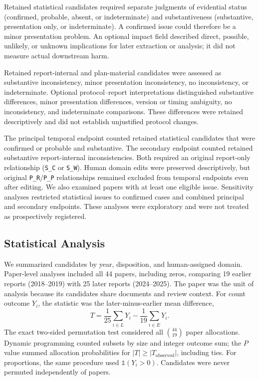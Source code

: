 \documentclass[12pt,a4paper]{article}
\begin{document}
Retained statistical candidates required separate judgments of evidential status (confirmed, probable, absent, or indeterminate) and substantiveness (substantive, presentation only, or indeterminate). A confirmed issue could therefore be a minor presentation problem. An optional impact field described direct, possible, unlikely, or unknown implications for later extraction or analysis; it did not measure actual downstream harm.

Retained report-internal and plan-material candidates were assessed as substantive inconsistency, minor presentation inconsistency, no inconsistency, or indeterminate. Optional protocol--report interpretations distinguished substantive differences, minor presentation differences, version or timing ambiguity, no inconsistency, and indeterminate comparisons. These differences were retained descriptively and did not establish unjustified protocol changes.

The principal temporal endpoint counted retained statistical candidates that were confirmed or probable and substantive. The secondary endpoint counted retained substantive report-internal inconsistencies. Both required an original report-only relationship (\texttt{S\_C} or \texttt{S\_W}). Human domain edits were preserved descriptively, but original \texttt{P\_R}/\texttt{P\_P} relationships remained excluded from temporal endpoints even after editing. We also examined papers with at least one eligible issue. Sensitivity analyses restricted statistical issues to confirmed cases and combined principal and secondary endpoints. These analyses were exploratory and were not treated as prospectively registered.

\subsection{Statistical Analysis}
\label{sec:statistics}

We summarized candidates by year, disposition, and human-assigned domain. Paper-level analyses included all 44 papers, including zeros, comparing 19 earlier reports (2018--2019) with 25 later reports (2024--2025). The paper was the unit of analysis because its candidates share documents and review context. For count outcome \(Y_i\), the statistic was the later-minus-earlier mean difference,
\[
T=\frac{1}{25}\sum_{i\in L}Y_i-\frac{1}{19}\sum_{i\in E}Y_i.
\]
The exact two-sided permutation test considered all \(\binom{44}{19}\) paper allocations. Dynamic programming counted subsets by size and integer outcome sum; the \(P\) value summed allocation probabilities for \(|T|\geq|T_{\mathrm{observed}}|\), including ties. For proportions, the same procedure used \(\mathbb{1}(Y_i>0)\). Candidates were never permuted independently of papers.
\end{document}
